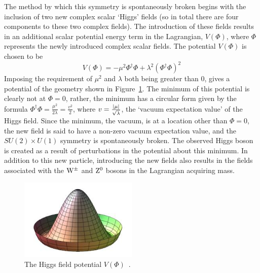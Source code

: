 The method by which this symmetry is spontaneously broken begins with the inclusion of two new complex scalar
`Higgs' fields (so in total there are four components to these two complex fields). The introduction of these
fields results in an additional scalar potential energy term in the Lagrangian, $V(\Phi)$, where $\Phi$
represents the newly introduced complex scalar fields. %
The potential $V(\Phi)$ is chosen to be
\begin{equation}
V(\Phi) = -\mu^{2} \Phi^\dagger \Phi + \lambda^{2} (\Phi^\dagger \Phi)^{2}
\end{equation}
Imposing the requirement of $\mu^{2}$ and $\lambda$ both being greater than 0, gives a potential of the
geometry shown in Figure~\ref{fig:higgs_potential}. The minimum of this potential is clearly not at
$\Phi=0$, rather, the minimum has a circular form given by the formula $\Phi^\dagger \Phi =
\frac{\mu^{2}}{2\lambda} = \frac{v^{2}}{2}$, where $v = \frac{\lvert \mu \rvert}{\sqrt\lambda}$, the `vacuum
expectation value' of the Higgs field. Since the minimum, \ie the vacuum, is at a location other than $\Phi =
0$, the new field is said to have a non-zero vacuum expectation value, and the $SU(2) \times U(1)$ symmetry is
spontaneously broken. The observed Higgs boson is created as a result of perturbations in the potential about
this minimum. %
In addition to this new particle, introducing the new fields also results in the fields associated with the
$\mathrm{W}^{\pm}$ and $\mathrm{Z}^{0}$ bosons in the Lagrangian acquiring mass.

\begin{figure}[hbtp]
   \centering
     \includegraphics[width=0.5\textwidth]{Chapters/03_Theory/Images/higgspot}\hfill
     \caption[The Higgs field potential.]{The Higgs field potential $V(\Phi)$~\cite{Moss:2015fma}.}
     \label{fig:higgs_potential}
\end{figure}

